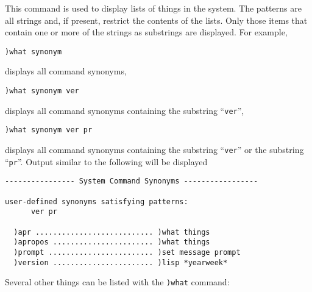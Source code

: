 {{{{{{{\par{}

This command is used to display lists of things in the system.  The
patterns are all strings and, if present, restrict the contents of the
lists.  Only those items that contain one or more of the strings as
substrings are displayed.  For example,
\begin{verbatim}
)what synonym
\end{verbatim}
displays all command synonyms,
\begin{verbatim}
)what synonym ver
\end{verbatim}
displays all command synonyms containing the substring ``{\tt ver}'',
\begin{verbatim}
)what synonym ver pr
\end{verbatim}
displays all command synonyms
containing the substring  ``{\tt ver}'' or  the substring
``{\tt pr}''.
Output similar to the following will be displayed
\begin{verbatim}
---------------- System Command Synonyms -----------------

user-defined synonyms satisfying patterns:
      ver pr

  )apr ........................... )what things
  )apropos ....................... )what things
  )prompt ........................ )set message prompt
  )version ....................... )lisp *yearweek*
\end{verbatim}

Several other things can be listed with the {\tt )what} command:

}}}}}}}
